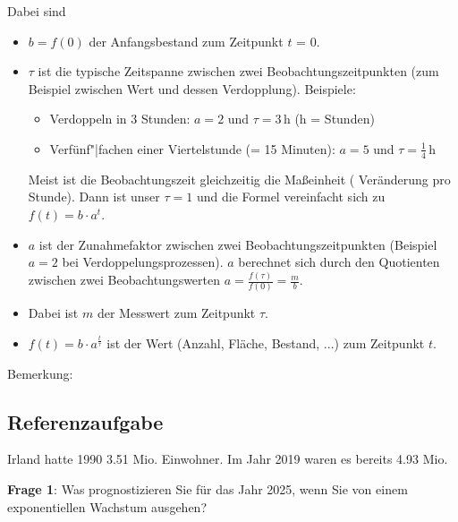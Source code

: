 Dabei sind
\begin{itemize}
\item $b=f(0)$ der Anfangsbestand zum Zeitpunkt $t$ = 0.
\item $\tau$ ist die typische Zeitspanne zwischen zwei Beobachtungszeitpunkten (zum Beispiel zwischen Wert und dessen Verdopplung). Beispiele:
  \begin{itemize}
  \item Verdoppeln in 3 Stunden: $a=2$ und $\tau = 3\, \text{h}$
    ($\text{h}$ = Stunden)
  \item Verfünf"|fachen einer Viertelstunde (= 15 Minuten): $a=5$ und
    $\tau=\frac{1}{4}\, \text{h}$
  \end{itemize}
  Meist ist die Beobachtungszeit gleichzeitig die Maßeinheit (\zB
  Veränderung pro Stunde). Dann ist unser $\tau=1$ und die Formel
  vereinfacht sich zu $f(t) = b\cdot{}a^t$.
\item $a$ ist der Zunahmefaktor zwischen zwei Beobachtungszeitpunkten (Beispiel $a=2$ bei Verdoppelungsprozessen).
  $a$ berechnet sich durch den Quotienten zwischen zwei
  Beobachtungswerten $a = \frac{f(\tau)}{f(0)} =\frac{m}{b}$.
\item
  Dabei ist $m$ der Messwert zum Zeitpunkt $\tau$.
\item $f(t)=b\cdot{}a^{\frac{t}{\tau}}$ ist der Wert (Anzahl, Fläche,
  Bestand, ...) zum Zeitpunkt
  $t$. 
\end{itemize}

Bemerkung: 
\newpage

\subsection{Referenzaufgabe}
Irland hatte 1990 3.51 Mio. Einwohner. Im Jahr 2019 waren es bereits 4.93 Mio.

\textbf{Frage 1}: Was prognostizieren Sie für das Jahr 2025, wenn Sie von einem exponentiellen Wachstum ausgehen?


